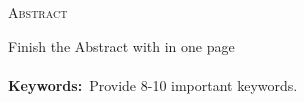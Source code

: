  \cleardoublepage
 \setcounter{page}{5}
 \begin{center}
 {\LARGE \textsc{Abstract}}
 \end{center}
 \vspace{1cm}
 Finish the Abstract with in one page\\
 \\
 \vspace{0.5cm} \noindent \textbf{Keywords:}~Provide 8-10 important keywords.
